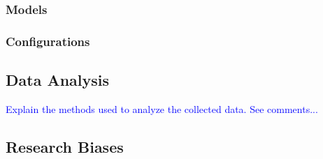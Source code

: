 \subsubsection{Models}
%

\subsubsection{Configurations}
%

\subsection{Data Analysis}
%
%
%
\textcolor{blue}{Explain the methods used to analyze the collected data. See comments...}

\subsection{Research Biases}
%

